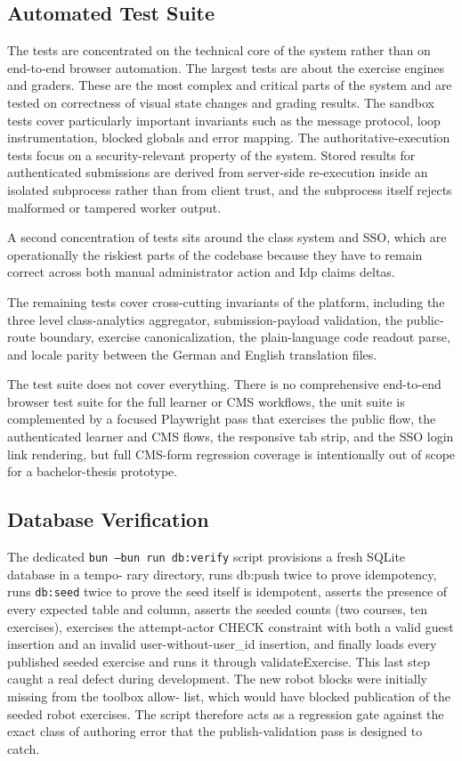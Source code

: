 \subsection{Automated Test Suite}
The tests are concentrated on the technical core of the system rather than on end-to-end browser automation. 
The largest tests are about the exercise engines and graders.
These are the most complex and critical parts of the system and are tested on correctness of visual state changes and 
grading results.
The sandbox tests cover particularly important invariants such as the message protocol, loop instrumentation, blocked 
globals  and error mapping.
The authoritative-execution tests focus on a security-relevant property of the system. Stored results for authenticated 
submissions are derived from server-side re-execution inside an isolated subprocess rather than from client trust,
and the subprocess itself rejects malformed or tampered worker output.

A second concentration of tests sits around the class system and SSO, which are operationally the riskiest parts of the 
codebase because they have to remain correct across both manual administrator action and Idp claims deltas.

The remaining tests cover cross-cutting invariants of the platform, including the three level class-analytics aggregator, 
submission-payload validation, the public-route boundary, exercise canonicalization, the plain-language code 
readout parse, and locale parity between the German and English translation files.

The test suite does not cover everything. There is no comprehensive end-to-end browser
test suite for the full learner or CMS workflows, the unit suite is complemented by a focused
Playwright pass that exercises the public flow, the authenticated learner and CMS flows, the
responsive tab strip, and the SSO login link rendering, but full CMS-form regression coverage
is intentionally out of scope for a bachelor-thesis prototype.

\subsection{Database Verification}
The dedicated \texttt{bun --bun run db:verify} script provisions a fresh SQLite database in a tempo-
rary directory, runs db:push twice to prove idempotency, runs \texttt{db:seed} twice to prove the seed
itself is idempotent, asserts the presence of every expected table and column, asserts the seeded
counts (two courses, ten exercises), exercises the attempt-actor CHECK constraint with both a
valid guest insertion and an invalid user-without-user\_id insertion, and finally loads every
published seeded exercise and runs it through validateExercise. This last step caught a real
defect during development. The new robot blocks were initially missing from the toolbox allow-
list, which would have blocked publication of the seeded robot exercises. The script therefore
acts as a regression gate against the exact class of authoring error that the publish-validation
pass is designed to catch.

